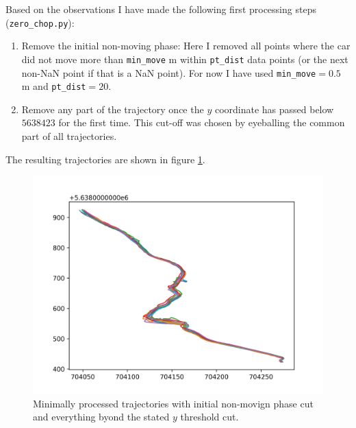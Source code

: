\documentclass[a4]{article}
\begin{document}
Based on the observations I have made the following first processing
steps (\verb+zero_chop.py+):
\begin{enumerate}
  \item Remove the initial non-moving phase: Here I removed all points
    where the car did not move more than \verb+min_move+ m within
    \verb+pt_dist+ data points (or the next non-NaN point if that is a
    NaN point). For now I have used \verb+min_move+$= 0.5$ m and
    \verb+pt_dist+$= 20$.
  \item Remove any part of the trajectory once the $y$ coordinate has
    passed below $5638423$ for the first time. This cut-off was chosen
    by eyeballing the common part of all trajectories.
\end{enumerate}
The resulting trajectories are shown in figure \ref{fig:procTraj1}.
\begin{figure}
  \includegraphics[width=\textwidth]{figures/cut_trajectories_onepanel.png}
  \caption{\label{fig:procTraj1} Minimally processed trajectories with
  initial non-movign phase cut and everything byond the stated $y$
  threshold cut.}
\end{figure}
\end{document}
